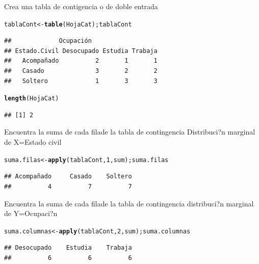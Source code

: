 \documentclass[10pt,a4paper]{article}\usepackage[]{graphicx}\usepackage[]{color}
\makeatletter
\newcommand{\hlnum}[1]{\textcolor[rgb]{0.686,0.059,0.569}{#1}}%
\newcommand{\hlstd}[1]{\textcolor[rgb]{0.345,0.345,0.345}{#1}}%
\newcommand{\hlkwb}[1]{\textcolor[rgb]{0.69,0.353,0.396}{#1}}%
\newcommand{\hlkwd}[1]{\textcolor[rgb]{0.737,0.353,0.396}{\textbf{#1}}}%
\newenvironment{kframe}{%
 \def\at@end@of@kframe{}%
 \ifinner\ifhmode%
  \def\at@end@of@kframe{\end{minipage}}%
  \begin{minipage}{\columnwidth}%
 \fi\fi%
 \def\FrameCommand##1{\hskip\@totalleftmargin \hskip-\fboxsep
 \colorbox{shadecolor}{##1}\hskip-\fboxsep
     \hskip-\linewidth \hskip-\@totalleftmargin \hskip\columnwidth}%
 \MakeFramed {\advance\hsize-\width
   \@totalleftmargin\z@ \linewidth\hsize
   \@setminipage}}%
 {\par\unskip\endMakeFramed%
 \at@end@of@kframe}
\newenvironment{knitrout}{}{} %
\makeatother
\begin{document}
Crea una tabla de contigencia o de doble entrada 
\begin{knitrout}
\color{fgcolor}\begin{kframe}
\begin{alltt}
\hlstd{tablaCont} \hlkwb{<-} \hlkwd{table}\hlstd{(HojaCat); tablaCont}
\end{alltt}
\begin{verbatim}
##             Ocupación
## Estado.Civil Desocupado Estudia Trabaja
##   Acompañado          2       1       1
##   Casado              3       2       2
##   Soltero             1       3       3
\end{verbatim}
\begin{alltt}
\hlkwd{length}\hlstd{(HojaCat)}
\end{alltt}
\begin{verbatim}
## [1] 2
\end{verbatim}
\end{kframe}
\end{knitrout}

 Encuentra la suma de cada filade la tabla de contingencia 
 Distribuci?n marginal de X=Estado civil 
\begin{knitrout}
\color{fgcolor}\begin{kframe}
\begin{alltt}
\hlstd{suma.filas} \hlkwb{<-} \hlkwd{apply}\hlstd{(tablaCont,} \hlnum{1}\hlstd{, sum); suma.filas}
\end{alltt}
\begin{verbatim}
## Acompañado     Casado    Soltero 
##          4          7          7
\end{verbatim}
\end{kframe}
\end{knitrout}

 Encuentra la suma de cada filade la tabla de contingencia 
 distribuci?n marginal de Y=Ocupaci?n 
\begin{knitrout}
\color{fgcolor}\begin{kframe}
\begin{alltt}
\hlstd{suma.columnas} \hlkwb{<-} \hlkwd{apply}\hlstd{(tablaCont,}\hlnum{2}\hlstd{,sum); suma.columnas}
\end{alltt}
\begin{verbatim}
## Desocupado    Estudia    Trabaja 
##          6          6          6
\end{verbatim}
\end{kframe}
\end{knitrout}
\end{document}
